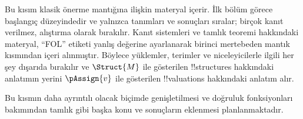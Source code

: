 \documentclass[../../include/open-logic-part]{subfiles}
\begin{document}

\begin{editorial}
  Bu kısım klasik önerme mantığına ilişkin materyal içerir. İlk bölüm
  görece başlangıç düzeyindedir ve yalnızca tanımları ve sonuçları sıralar;
  birçok kanıt verilmez, alıştırma olarak bırakılır. Kanıt sistemleri ve
  tamlık teoremi hakkındaki materyal, ``FOL'' etiketi yanlış değerine
  ayarlanarak birinci mertebeden mantık kısmından içeri alınmıştır. Böylece
  yüklemler, terimler ve niceleyicilerle ilgili her şey dışarıda bırakılır ve
  $\Struct{M}$ ile gösterilen !!{structure}s hakkındaki anlatımın yerini
  $\pAssign{v}$ ile gösterilen !!{valuation}s hakkındaki anlatım alır.

  Bu kısmın daha ayrıntılı olacak biçimde genişletilmesi ve doğruluk
  fonksiyonları bakımından tamlık gibi başka konu ve sonuçların eklenmesi
  planlanmaktadır.
\end{editorial}










\OLEndPartHook
\end{document}

